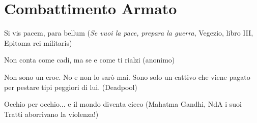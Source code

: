 \section{Combattimento Armato}\label{combattimento-armato}

\begin{changemargin}{0.3cm}{0.3cm}\begin{enfasi}{
Si vis pacem, para bellum (\emph{Se vuoi la pace, prepara la guerra}, Vegezio, libro III, Epitoma rei militaris)
\smallskip

Non conta come cadi, ma se e come ti rialzi (anonimo)

\smallskip

Non sono un eroe. No e non lo sarò mai. Sono solo un cattivo che viene pagato per pestare tipi peggiori di lui. (Deadpool)

\smallskip

Occhio per occhio... e il mondo diventa cieco (Mahatma Gandhi, NdA i suoi Tratti aborrivano la violenza!)}\end{enfasi}\end{changemargin}

